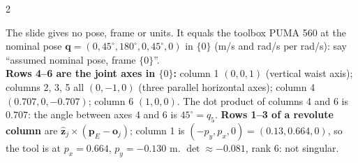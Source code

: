 \begin{multicols}{2}
\begin{worked}
The slide gives no pose, frame or units. It equals the toolbox PUMA 560 at the nominal pose $\mathbf q=(0,45^\circ,180^\circ,0,45^\circ,0)$ in $\{0\}$ (m/s and rad/s per rad/s): say ``assumed nominal pose, frame $\{0\}$''. \chk\\
\textbf{Rows 4--6 are the joint axes in $\{0\}$:} column 1 $(0,0,1)$ (vertical waist axis); columns 2, 3, 5 all $(0,-1,0)$ (three parallel horizontal axes); column 4 $(0.707,0,-0.707)$; column 6 $(1,0,0)$. The dot product of columns 4 and 6 is $0.707$: the angle between axes 4 and 6 is $45^\circ=q_5$. \textbf{Rows 1--3 of a revolute column} are $\hat{\mathbf z}_j\times(\mathbf p_E-\mathbf o_j)$; column 1 is $(-p_y,p_x,0)=(0.13,0.664,0)$, so the tool is at $p_x=0.664$, $p_y=-0.130$ m. $\det\approx-0.081$, rank 6: not singular. \chk
\end{worked}


\end{multicols}
